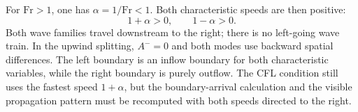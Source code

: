 For $\mathrm{Fr}>1$, one has $\alpha=1/\mathrm{Fr}<1$. Both characteristic
speeds are then positive:
\begin{equation}
 1+\alpha>0,
 \qquad
 1-\alpha>0.
\end{equation}
Both wave families travel downstream to the right; there is no left-going wave
train. In the upwind splitting, $A^-=0$ and both modes use backward spatial
differences. The left boundary is an inflow boundary for both characteristic
variables, while the right boundary is purely outflow. The CFL condition still
uses the fastest speed $1+\alpha$, but the boundary-arrival calculation and the
visible propagation pattern must be recomputed with both speeds directed to
the right.
